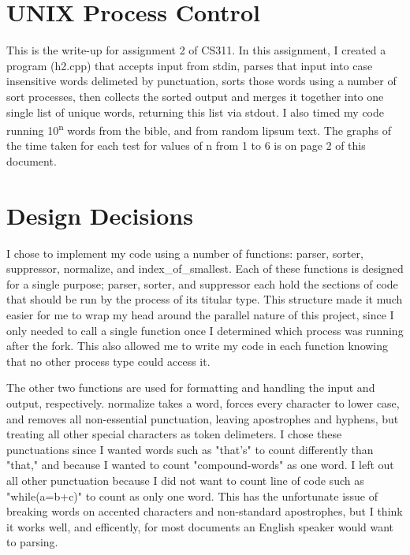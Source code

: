 \documentclass[letterpaper,10pt,twocolumn,titlepage]{article}
\begin{document}


\section{UNIX Process Control}

This is the write-up for assignment 2 of CS311. 
In this assignment, I created a program (h2.cpp) that accepts input from stdin,
parses that input into case insensitive words delimeted by punctuation, sorts those
words using a number of sort processes, then collects the sorted output and merges it 
together into one single list of unique words, returning this list via stdout.
I also timed my code running 10\textsuperscript{n} words from the bible, 
and from random lipsum text. The graphs of the time taken for each test for 
values of n from 1 to 6 is on page 2 of this document.
 
\section{Design Decisions}

I chose to implement my code using a number of functions: 
parser, sorter, suppressor, normalize, and index\_of\_smallest.
Each of these functions is designed for a single purpose; parser,
sorter, and suppressor each hold the sections of code that should
be run by the process of its titular type. This structure made it
much easier for me to wrap my head around the parallel nature of
this project, since I only needed to call a single function once
I determined which process was running after the fork. This also
allowed me to write my code in each function knowing that no other
process type could access it.

The other two functions are used for formatting and handling the
input and output, respectively. normalize takes a word, forces every
character to lower case, and removes all non-essential punctuation, 
leaving apostrophes and hyphens, but treating all other special 
characters as token delimeters. I chose these punctuations since
I wanted words such as "that's" to count differently than "that,"
and because I wanted to count "compound-words" as one word. I left
out all other punctuation because I did not want to count line of code 
such as "while(a=b+c)" to count as only one word. This has the unfortunate 
issue of breaking words on accented characters and non-standard apostrophes, 
but I think it works well, and efficently, for most documents an English 
speaker would want to parsing.
\end{document}
